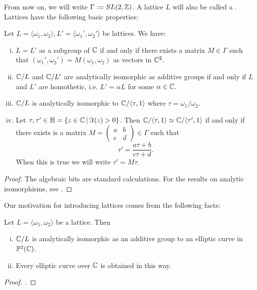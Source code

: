 \documentclass[12pt, a4paper]{amsart}
\begin{document}
From now on, we will write $\Gamma := SL(2,{\mathbb Z})$.
A lattice $L$ will also be called a .
Lattices have the following basic properties:
\begin{prop} \label{lattice}
  Let $L = \langle \omega_1, \omega_2 \rangle, L' = \langle \omega_1', \omega_2'
  \rangle$ be lattices. We have:
  \begin{enumerate}[(i)]
  \item $L = L'$ as a subgroup of ${\mathbb C}$ if and only if there exists a matrix $M
    \in \Gamma$ such that $(\omega_1', \omega_2') = M (\omega_1, \omega_2)$
    as vectors in ${\mathbb C}^2.$
  \item ${\mathbb C} / L$ and ${\mathbb C} / L'$ are analytically isomorphic as additive groups
    if and only if $L$ and $L'$ are homothetic, i.e.
    $L' = \alpha L$ for some $\alpha \in {\mathbb C}.$
  \item ${\mathbb C} / L$ is analytically isomorphic to ${\mathbb C} /\langle \tau, 1
    \rangle$ where $\tau = \omega_1/\omega_2$.
  \item Let $\tau, \tau' \in \mathbb{H} = \{z \in {\mathbb C} \, | \, \Im(z) > 0 \}$.
    Then ${\mathbb C} / \langle \tau, 1 \rangle \simeq {\mathbb C} / \langle \tau', 1 \rangle$
  if and only if there exists is a matrix $M = \left(
    \begin{smallmatrix}
      a & b \\ c & d
    \end{smallmatrix} \right) \in \Gamma$
    such that
    \[\tau' = \frac{a\tau+b}{c\tau +d}. \]
    When this is true we will write $\tau' = M\tau$.
  \end{enumerate}
\end{prop}
\begin{proof}
  The algebraic bits are standard calculations. For the results on analytic
  isomorphisms, see \cite[Appendix B.6, pages 168-169]{simple}.
\end{proof}

Our motivation for introducing lattices comes from the following facts:

\begin{prop}
  Let $L = \langle \omega_1, \omega_2 \rangle$ be a lattice. Then
  \begin{enumerate}[(i)]
  \item ${\mathbb C}/L$ is analytically isomorphic as an additive group
    to an elliptic curve in ${\mathbb P}^2({\mathbb C})$.
  \item Every elliptic curve over ${\mathbb C}$ is obtained in this way.
  \end{enumerate}
\end{prop}
\begin{proof}
  \cite[See][Pages 131-134 and 136-137]{Granville}.
\end{proof}
\end{document}
